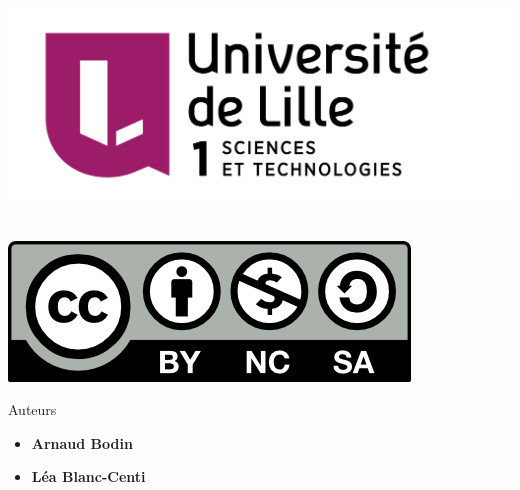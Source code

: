 









\begin{frame}

\thispagestyle{empty}    

  \hspace*{-20ex}
  \begin{minipage}{0.55\textwidth}
  \begin{center}
    \vspace*{5ex}   


    \bigskip

    \includegraphics[scale=0.13]{../divers/Logo-Univ-Lille-1-new.png}
\ 

    \vspace*{5ex}

    \includegraphics[scale=0.5]{by-nc-sa.png}
  \end{center}
  \end{minipage}
  \hfil
  \begin{minipage}{0.45\textwidth}
  \vspace*{5ex}
  Auteurs
  \begin{itemize}
    \item {\bf Arnaud Bodin}
    \item {\bf Léa Blanc-Centi}
  \end{itemize}


\end{minipage}
\end{frame}

